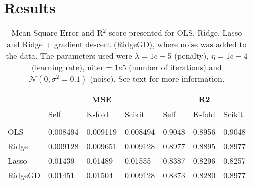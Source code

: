 \section{Results} \label{sec:results}

\begin{table} [H]
	\caption{Mean Square Error and R$^2$-score presented for OLS, Ridge, Lasso and Ridge + gradient descent (RidgeGD), where noise was added to the data. The parameters used were $\lambda=1e-5$ (penalty), $\eta=1e-4$ (learning rate), $\text{niter}=1e5$ (number of iterations) and $\mathcal{N}(0, \sigma^2=0.1)$ (noise). See text for more information.}
	\begin{tabularx}{\textwidth}{l|XXX|XXX} \hline\hline
		\label{tab:franke_error}
		& \multicolumn{3}{c}{\textbf{MSE}}&\multicolumn{3}{c}{\textbf{R2}}\\ \hline
		&Self&K-fold&Scikit&Self&K-fold&Scikit\\ \hline \\
		OLS & 0.008494 & 0.009119 & 0.008494 & 0.9048 & 0.8956 & 0.9048 \\
		Ridge & 0.009128 & 0.009651 & 0.009128 & 0.8977 & 0.8895 & 0.8977 \\
		Lasso & 0.01439 & 0.01489 & 0.01555 & 0.8387 & 0.8296 & 0.8257 \\
		RidgeGD & 0.01451 & 0.01504 & 0.009128 & 0.8373 & 0.8280 & 0.8977 \\ \hline
	\end{tabularx}
\end{table}

\iffalse
\begin{figure} [H]%
	\centering
	\subfloat[Lambda vs. R2-score]{{\texttt{[image: ../plots/lambda\_R2score.png]} }}%
	\subfloat[Variance vs. R2-score]{{\texttt{[image: ../plots/var\_R2score.png]} }}
	\caption{R$^2$-score plotted as a function of the penalty $\lambda$ (a) and as a function of the noise (b). $\lambda\in[10^{-8},10^2]$ in (a) and $\sigma^2\in[10^{-6},10^{-0.7}]$ in (b). The other parameters used were $\lambda=1e-5$ (penalty, was held constant for (b) only), $\eta=1e-4$ (learning rate), $niter=1e5$ (number of iterations) and $\mathcal{N}(0, \sigma^2=0.1)$ (noise, was held constant for (a) only).}%
	\label{fig:R2_scores}
\end{figure}
\fi 


